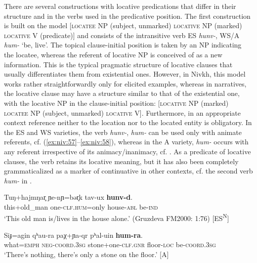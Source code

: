 \documentclass[output=paper,colorlinks,citecolor=brown]{langscibook}
\begin{document}
There are several constructions with locative predications that differ in their structure and in the verbs used in the predicative position.
The first construction is built on the model [\textsc{locatee} NP (subject, unmarked) \textsc{locative} NP (marked) \textsc{locative} V (predicate)] and consists of the intransitive verb ES \textit{hunv-}, WS/A \textit{hum-} ‘be, live’. The topical clause-initial position is taken by an NP indicating the locatee, whereas the referent of locative NP is conceived of as a new information. This is the typical pragmatic structure of locative clauses that usually differentiates them from existential ones. However, in Nivkh, this model works rather straightforwardly only for elicited examples, whereas in narratives, the locative clause may have a structure similar to that of the existential one, with the locative NP in the clause-initial position: [\textsc{locative} NP (marked) \textsc{locatee} NP (subject, unmarked) \textsc{locative} V]. Furthermore, in an appropriate context reference neither to the location nor to the located entity is obligatory. In the ES and WS varieties, the verb \textit{hunv-}, \textit{hum-} can be used only with animate referents, cf. (\ref{ex:niv:57}--\ref{ex:niv:58}), whereas in the A variety, \textit{hum-} occurs with any referent irrespective of its animacy/inanimacy, cf. . As a predicate of locative clauses, the verb retains its locative meaning, but it has also been completely grammaticalized as a marker of continuative in other contexts, cf. the second verb \textit{hum-} in .

\ea\label{ex:niv:57}
    \gll Tuŋ+hajmŋar̥ ɲe-nɲ=bǝr̥k tav-ux \textbf{hunv-d}. \\ 
         this+old\_man one-\textsc{clf.hum}=only house-\textsc{abl} be-\textsc{ind} \\
    \glt ‘This old man is/lives in the house alone.’ (Gruzdeva FM2000: 1:76) [ES\textsuperscript{N}]
\z 


\ea\label{ex:niv:59}
    \gll Siɟ=agin qʰau{}-ra paχ+ɲa{}-qr pʰal{}-uin \textbf{hum-ra}.\\ 
         what=\textsc{emph} \textsc{neg-coord.3sg} stone+one-\textsc{clf.gnr} floor-\textsc{loc} be{}-\textsc{coord.3sg}\\
    \glt ‘There’s nothing, there’s only a stone on the floor.’ \citep[226]{Panfilov1965} [A]
\z 
\end{document}
